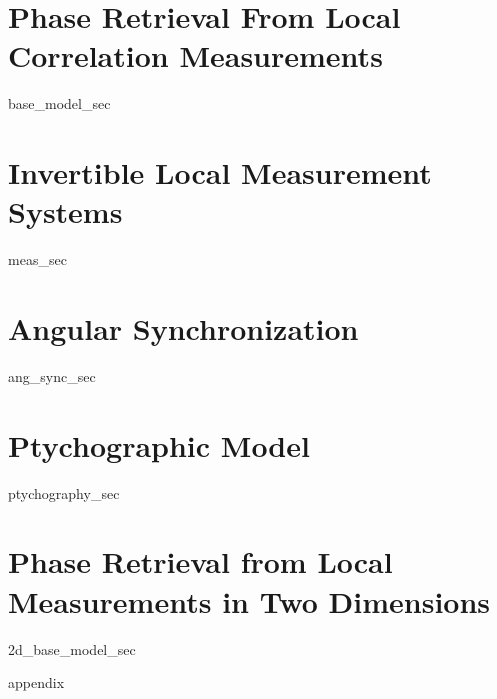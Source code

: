 \documentclass[12pt]{ucsd-thesis-2018}
\begin{document}
\chapter{Phase Retrieval From Local Correlation Measurements}
\label{ch:our_model}
\label{ch:base_model}
{base_model_sec}

\chapter{Invertible Local Measurement Systems}
{meas_sec}

\chapter{Angular Synchronization}
{ang_sync_sec}

\chapter{Ptychographic Model}
{ptychography_sec}

\chapter{Phase Retrieval from Local Measurements in Two Dimensions}
{2d_base_model_sec}



\appendix
{appendix}

{
}
\end{document}
